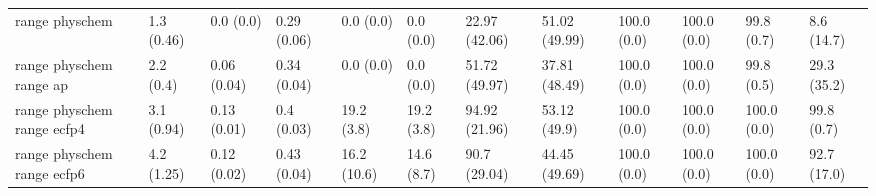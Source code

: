 \begin{tabular}{llllllllllll}
range physchem & {\cellcolor[HTML]{F6FCFD}} \color[HTML]{000000} 1.3 (0.46) & {\cellcolor[HTML]{F7FCFD}} \color[HTML]{000000} 0.0 (0.0) & {\cellcolor[HTML]{BDE6DE}} \color[HTML]{000000} 0.29 (0.06) & {\cellcolor[HTML]{F7FCFD}} \color[HTML]{000000} 0.0 (0.0) & {\cellcolor[HTML]{F7FCFD}} \color[HTML]{000000} 0.0 (0.0) & {\cellcolor[HTML]{D1EEE9}} \color[HTML]{000000} 22.97 (42.06) & {\cellcolor[HTML]{63C0A0}} \color[HTML]{000000} 51.02 (49.99) & {\cellcolor[HTML]{00441B}} \color[HTML]{F1F1F1} 100.0 (0.0) & {\cellcolor[HTML]{00441B}} \color[HTML]{F1F1F1} 100.0 (0.0) & {\cellcolor[HTML]{00441B}} \color[HTML]{F1F1F1} 99.8 (0.7) & {\cellcolor[HTML]{EBF7FA}} \color[HTML]{000000} 8.6 (14.7) \\
range physchem range ap & {\cellcolor[HTML]{F5FBFD}} \color[HTML]{000000} 2.2 (0.4) & {\cellcolor[HTML]{F7FCFD}} \color[HTML]{000000} 0.06 (0.04) & {\cellcolor[HTML]{A5DDD0}} \color[HTML]{000000} 0.34 (0.04) & {\cellcolor[HTML]{F7FCFD}} \color[HTML]{000000} 0.0 (0.0) & {\cellcolor[HTML]{F7FCFD}} \color[HTML]{000000} 0.0 (0.0) & {\cellcolor[HTML]{61BF9E}} \color[HTML]{000000} 51.72 (49.97) & {\cellcolor[HTML]{98D8C9}} \color[HTML]{000000} 37.81 (48.49) & {\cellcolor[HTML]{00441B}} \color[HTML]{F1F1F1} 100.0 (0.0) & {\cellcolor[HTML]{00441B}} \color[HTML]{F1F1F1} 100.0 (0.0) & {\cellcolor[HTML]{00441B}} \color[HTML]{F1F1F1} 99.8 (0.5) & {\cellcolor[HTML]{BAE5DC}} \color[HTML]{000000} 29.3 (35.2) \\
range physchem range ecfp4 & {\cellcolor[HTML]{F1FAFC}} \color[HTML]{000000} 3.1 (0.94) & {\cellcolor[HTML]{F7FCFD}} \color[HTML]{000000} 0.13 (0.01) & {\cellcolor[HTML]{8DD3C0}} \color[HTML]{000000} 0.4 (0.03) & {\cellcolor[HTML]{D8F0EF}} \color[HTML]{000000} 19.2 (3.8) & {\cellcolor[HTML]{D8F0EF}} \color[HTML]{000000} 19.2 (3.8) & {\cellcolor[HTML]{005321}} \color[HTML]{F1F1F1} 94.92 (21.96) & {\cellcolor[HTML]{5CBD98}} \color[HTML]{F1F1F1} 53.12 (49.9) & {\cellcolor[HTML]{00441B}} \color[HTML]{F1F1F1} 100.0 (0.0) & {\cellcolor[HTML]{00441B}} \color[HTML]{F1F1F1} 100.0 (0.0) & {\cellcolor[HTML]{00441B}} \color[HTML]{F1F1F1} 100.0 (0.0) & {\cellcolor[HTML]{00441B}} \color[HTML]{F1F1F1} 99.8 (0.7) \\
range physchem range ecfp6 & {\cellcolor[HTML]{F6FCFD}} \color[HTML]{000000} 4.2 (1.25) & {\cellcolor[HTML]{F7FCFD}} \color[HTML]{000000} 0.12 (0.02) & {\cellcolor[HTML]{80CDB7}} \color[HTML]{000000} 0.43 (0.04) & {\cellcolor[HTML]{DEF2F4}} \color[HTML]{000000} 16.2 (10.6) & {\cellcolor[HTML]{E1F4F6}} \color[HTML]{000000} 14.6 (8.7) & {\cellcolor[HTML]{006227}} \color[HTML]{F1F1F1} 90.7 (29.04) & {\cellcolor[HTML]{7DCCB5}} \color[HTML]{000000} 44.45 (49.69) & {\cellcolor[HTML]{00441B}} \color[HTML]{F1F1F1} 100.0 (0.0) & {\cellcolor[HTML]{00441B}} \color[HTML]{F1F1F1} 100.0 (0.0) & {\cellcolor[HTML]{00441B}} \color[HTML]{F1F1F1} 100.0 (0.0) & {\cellcolor[HTML]{005B25}} \color[HTML]{F1F1F1} 92.7 (17.0) \\

\end{tabular}
